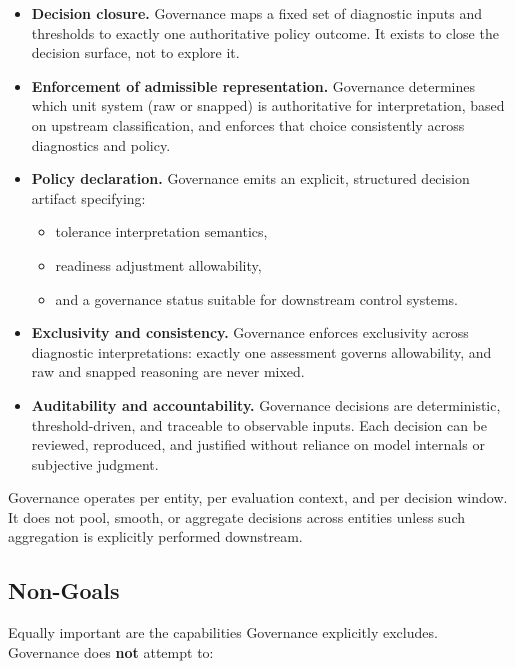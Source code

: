 \begin{itemize}
  \item \textbf{Decision closure.}
  Governance maps a fixed set of diagnostic inputs and thresholds to exactly one
  authoritative policy outcome. It exists to close the decision surface, not to
  explore it.

  \item \textbf{Enforcement of admissible representation.}
  Governance determines which unit system (raw or snapped) is authoritative for
  interpretation, based on upstream \DQC{} classification, and enforces that
  choice consistently across diagnostics and policy.

  \item \textbf{Policy declaration.}
  Governance emits an explicit, structured decision artifact specifying:
  \begin{itemize}
    \item tolerance interpretation semantics,
    \item readiness adjustment allowability,
    \item and a governance status suitable for downstream control systems.
  \end{itemize}

  \item \textbf{Exclusivity and consistency.}
  Governance enforces exclusivity across diagnostic interpretations:
  exactly one \FPC{} assessment governs allowability, and raw and snapped
  reasoning are never mixed.

  \item \textbf{Auditability and accountability.}
  Governance decisions are deterministic, threshold-driven, and traceable to
  observable inputs. Each decision can be reviewed, reproduced, and justified
  without reliance on model internals or subjective judgment.
\end{itemize}

Governance operates per entity, per evaluation context, and per decision window.
It does not pool, smooth, or aggregate decisions across entities unless such
aggregation is explicitly performed downstream.

\subsection{Non-Goals}

Equally important are the capabilities Governance explicitly excludes. Governance
does \textbf{not} attempt to:

